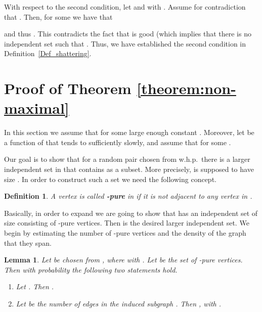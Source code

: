 \documentclass[a4paper,10pt]{article}
\newcommand{\qed}{\hfill\smallskip}
\newtheorem{definition}{Definition}\renewcommand{\thedefinition}{\arabic{definition}}
\newtheorem{lemma}{Lemma}\renewcommand{\thelemma}{\arabic{lemma}}
\newcommand{\whp}{w.h.p.}
\begin{document}
With respect to the second condition, let  and 
with . Assume for contradiction that .
Then, for some  we have that
	
and thus .
This contradicts the fact that  is good (which implies that there is no
	independent set  such that .
Thus, we have established the second condition in Definition~\ref{Def_shattering}.
\qed









\section{Proof of Theorem \ref{theorem:non-maximal}}\label{section:theorem:non-maximal}


In this section we assume that  for some large enough constant .
Moreover, let  be a function of  that tends to  sufficiently slowly,
and assume that  for some .

Our goal is to show that for a random pair  chosen from 
\whp\ there is a larger independent set  in  that contains  as a subset.
More precisely,  is supposed to have size .
In order to construct such a set  we need the following concept.

\begin{definition}
A vertex  is called {\bf -pure} in  if it is not adjacent to any vertex in .
\end{definition}
Basically, in order to expand  we are going to show that  has an independent set 
of size   consisting of -pure vertices.
Then  is the desired larger independent set.
We begin by estimating the number of -pure vertices and the density of the graph
that they span.




\begin{lemma}\label{lemma:pure-graph}
Let  be chosen from ,
	where
		  with . 
Let  be the set of -pure vertices.
Then with probability  the following two statements hold.
\begin{enumerate}
\item Let . Then .
\item Let  be the number of edges in the induced subgraph .
	Then , with .
\end{enumerate}
\end{lemma}
\end{document}
